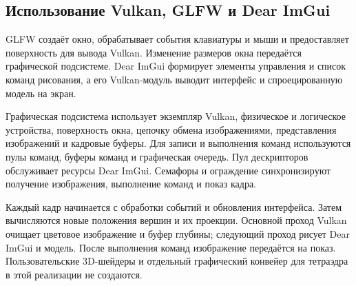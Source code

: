 \subsection{Использование Vulkan, GLFW и Dear ImGui}

GLFW создаёт окно, обрабатывает события клавиатуры и мыши и предоставляет поверхность для вывода Vulkan. Изменение размеров окна передаётся графической подсистеме. Dear ImGui формирует элементы управления и список команд рисования, а его Vulkan-модуль выводит интерфейс и спроецированную модель на экран.

Графическая подсистема использует экземпляр Vulkan, физическое и логическое устройства, поверхность окна, цепочку обмена изображениями, представления изображений и кадровые буферы. Для записи и выполнения команд используются пулы команд, буферы команд и графическая очередь. Пул дескрипторов обслуживает ресурсы Dear ImGui. Семафоры и ограждение синхронизируют получение изображения, выполнение команд и показ кадра.

Каждый кадр начинается с обработки событий и обновления интерфейса. Затем вычисляются новые положения вершин и их проекции. Основной проход Vulkan очищает цветовое изображение и буфер глубины; следующий проход рисует Dear ImGui и модель. После выполнения команд изображение передаётся на показ. Пользовательские 3D-шейдеры и отдельный графический конвейер для тетраэдра в этой реализации не создаются.
